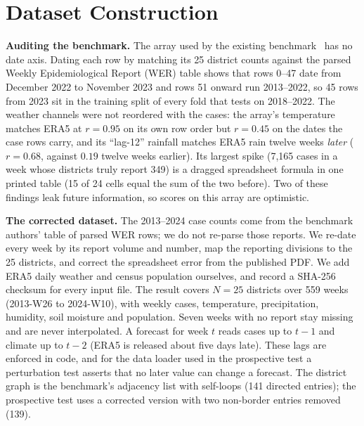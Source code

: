 \section{Dataset Construction}
\label{sec:data}

\textbf{Auditing the benchmark.} The array used by the existing
benchmark~\cite{weng2024graph} has no date axis. Dating each row by matching its 25
district counts against the parsed Weekly Epidemiological Report (WER) table shows
that rows 0--47 date from December 2022 to November 2023 and rows 51 onward run
2013--2022, so 45 rows from 2023 sit in
the training split of every fold that tests on 2018--2022. The weather channels were
not reordered with the cases: the array's temperature matches ERA5 at $r=0.95$ on its
own row order but $r=0.45$ on the dates the case rows carry, and its ``lag-12''
rainfall matches ERA5 rain twelve weeks \emph{later} ($r=0.68$, against $0.19$ twelve
weeks earlier). Its largest spike (7{,}165 cases in a week whose districts truly
report 349) is a dragged spreadsheet formula in one printed table (15 of 24 cells equal the sum of the two
before). Two of these findings leak future information, so scores on this array are
optimistic.

\textbf{The corrected dataset.} The 2013--2024 case counts come from the benchmark
authors' table of parsed WER rows; we do not re-parse those reports. We re-date every
week by its report volume and number, map the reporting divisions to the 25
districts, and correct the spreadsheet error from the published PDF. We add ERA5
daily weather and census population ourselves, and record a SHA-256 checksum for
every input file. The result covers $N=25$ districts over 559 weeks
(2013-W26 to 2024-W10), with weekly cases, temperature, precipitation, humidity, soil
moisture and population. Seven weeks with no report stay missing and are never
interpolated. A forecast for week $t$ reads cases up to $t-1$ and climate up to $t-2$
(ERA5 is released about five days late). These lags are enforced in code, and for the
data loader used in the prospective test a perturbation test asserts that no later
value can change a forecast. The district graph is the benchmark's adjacency list with self-loops (141 directed
entries); the prospective test uses a corrected version with two non-border entries
removed (139).

